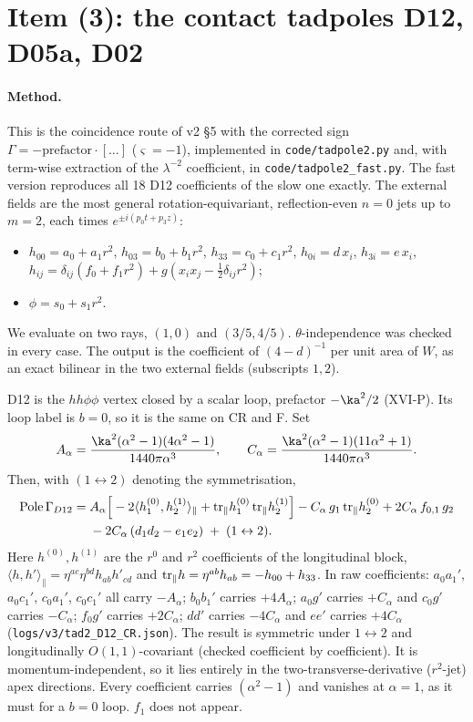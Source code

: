 \section{Item (3): the contact tadpoles D12, D05a, D02}\label{sec:tad}
\paragraph{Method.} This is the coincidence route of v2 \S5 with the corrected sign $\Gamma=-\text{prefactor}\cdot[\dots]$ ($\varsigma=-1$), implemented in \texttt{code/tadpole2.py} and, with term-wise extraction of the $\lambda^{-2}$ coefficient, in \texttt{code/tadpole2\_fast.py}. The fast version reproduces all 18 D12 coefficients of the slow one exactly. The external fields are the most general rotation-equivariant, reflection-even $n=0$ jets up to $m=2$, each times $e^{\pm i(p_0t+p_3z)}$:
\begin{itemize}
\item $h_{00}=a_0+a_1r^2$, $h_{03}=b_0+b_1r^2$, $h_{33}=c_0+c_1r^2$, $h_{0i}=d\,x_i$, $h_{3i}=e\,x_i$, $h_{ij}=\delta_{ij}(f_0+f_1r^2)+g(x_ix_j-\tfrac12\delta_{ij}r^2)$;
\item $\phi=s_0+s_1r^2$.
\end{itemize}
We evaluate on two rays, $(1,0)$ and $(3/5,4/5)$. $\theta$-independence was checked in every case. The output is the coefficient of $(4-d)^{-1}$ per unit area of $W$, as an exact bilinear in the two external fields (subscripts $1,2$).
\begin{theorem}\label{thm:D12}
D12 is the $hh\phi\phi$ vertex closed by a scalar loop, prefactor $-\ka^2/2$ (XVI-P). Its loop label is $b=0$, so it is the same on CR and F. Set
\[ A_\alpha=\frac{\ka^2(\alpha^2-1)(4\alpha^2-1)}{1440\pi\alpha^3},\qquad C_\alpha=\frac{\ka^2(\alpha^2-1)(11\alpha^2+1)}{1440\pi\alpha^3}. \]
Then, with $(1\leftrightarrow2)$ denoting the symmetrisation,
\begin{align*}
\mathrm{Pole}\,\Gamma_{D12}=\;&A_\alpha\Big[-2\langle h^{(0)}_1,h^{(1)}_2\rangle_\parallel+{\rm tr}_\parallel h^{(0)}_1\,{\rm tr}_\parallel h^{(1)}_2\Big]
-C_\alpha\,g_1\,{\rm tr}_\parallel h^{(0)}_2+2C_\alpha\,f_{0,1}\,g_2\\
&-2C_\alpha\,(d_1d_2-e_1e_2)\;+\;(1\leftrightarrow2).
\end{align*}
Here $h^{(0)},h^{(1)}$ are the $r^0$ and $r^2$ coefficients of the longitudinal block, $\langle h,h'\rangle_\parallel=\eta^{ac}\eta^{bd}h_{ab}h'_{cd}$ and ${\rm tr}_\parallel h=\eta^{ab}h_{ab}=-h_{00}+h_{33}$. In raw coefficients: $a_0a_1'$, $a_0c_1'$, $c_0a_1'$, $c_0c_1'$ all carry $-A_\alpha$; $b_0b_1'$ carries $+4A_\alpha$; $a_0g'$ carries $+C_\alpha$ and $c_0g'$ carries $-C_\alpha$; $f_0g'$ carries $+2C_\alpha$; $dd'$ carries $-4C_\alpha$ and $ee'$ carries $+4C_\alpha$ (\texttt{logs/v3/tad2\_D12\_CR.json}).
The result is symmetric under $1\leftrightarrow2$ and longitudinally $O(1,1)$-covariant (checked coefficient by coefficient). It is momentum-independent, so it lies entirely in the two-transverse-derivative ($r^2$-jet) apex directions. Every coefficient carries $(\alpha^2-1)$ and vanishes at $\alpha=1$, as it must for a $b=0$ loop. $f_1$ does not appear.
\end{theorem}
